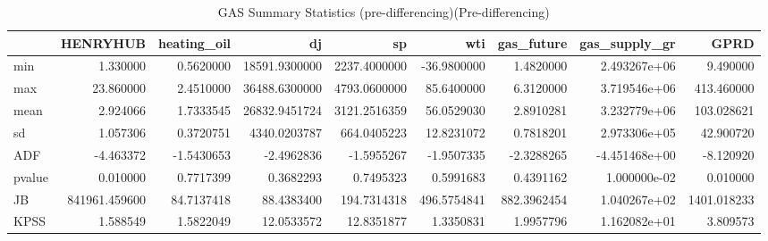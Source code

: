 \begin{table}
\centering
\caption{GAS Summary Statistics (pre-differencing)(Pre-differencing)}
\centering
\begin{tabular}[t]{l|r|r|r|r|r|r|r|r}
\hline
  & HENRYHUB & heating\_oil & dj & sp & wti & gas\_future & gas\_supply\_gr & GPRD\\
\hline
min & 1.330000 & 0.5620000 & 18591.9300000 & 2237.4000000 & -36.9800000 & 1.4820000 & 2.493267e+06 & 9.490000\\
\hline
max & 23.860000 & 2.4510000 & 36488.6300000 & 4793.0600000 & 85.6400000 & 6.3120000 & 3.719546e+06 & 413.460000\\
\hline
mean & 2.924066 & 1.7333545 & 26832.9451724 & 3121.2516359 & 56.0529030 & 2.8910281 & 3.232779e+06 & 103.028621\\
\hline
sd & 1.057306 & 0.3720751 & 4340.0203787 & 664.0405223 & 12.8231072 & 0.7818201 & 2.973306e+05 & 42.900720\\
\hline
ADF & -4.463372 & -1.5430653 & -2.4962836 & -1.5955267 & -1.9507335 & -2.3288265 & -4.451468e+00 & -8.120920\\
\hline
pvalue & 0.010000 & 0.7717399 & 0.3682293 & 0.7495323 & 0.5991683 & 0.4391162 & 1.000000e-02 & 0.010000\\
\hline
JB & 841961.459600 & 84.7137418 & 88.4383400 & 194.7314318 & 496.5754841 & 882.3962454 & 1.040267e+02 & 1401.018233\\
\hline
KPSS & 1.588549 & 1.5822049 & 12.0533572 & 12.8351877 & 1.3350831 & 1.9957796 & 1.162082e+01 & 3.809573\\
\hline
\end{tabular}
\end{table}
